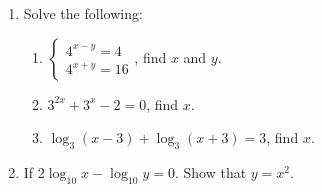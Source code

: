 \documentclass[11pt]{article}
\begin{document}
\begin{enumerate}
            \hrulefill
            
            \hrulefill
            
            \hrulefill
            
            \hrulefill
            
            \hrulefill

        \pagebreak
        \item Solve the following:\begin{enumerate}
            \item $\displaystyle\begin{cases}
                4^{x-y}=4\\
                4^{x+y}=16
            \end{cases}$, find $x$ and $y$.
            \item $3^{2x}+3^x-2=0$, find $x$.
            \item $\log_3(x-3)+\log_3(x+3)=3$, find $x$.
        \end{enumerate}

        \hrulefill
            
            \hrulefill
            
            \hrulefill
            
            \hrulefill
            
            \hrulefill

            \hrulefill
            
            \hrulefill
            
            \hrulefill
            
            \hrulefill
            
            \hrulefill
            
            \hrulefill
            
            \hrulefill

        \item If $2\log_{10}{x}-\log_{10}{y}=0$. Show that $y=x^2$.
            
            \hrulefill
            
            \hrulefill
            
            \hrulefill
            
            \hrulefill
            
            \hrulefill
            
            \hrulefill
            

\end{enumerate}
\end{document}
